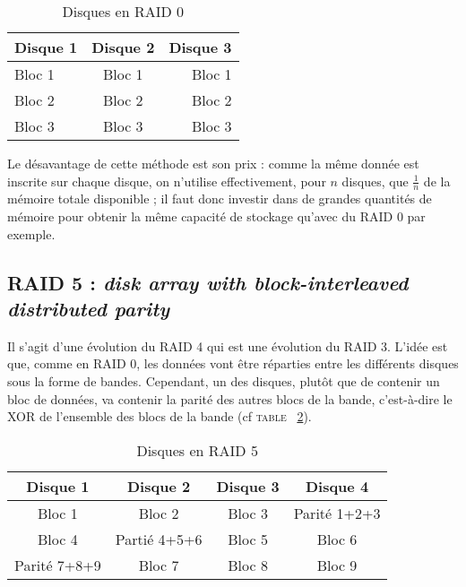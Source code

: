 \begin{table}[h]
    \centering
    \caption{\label{striping} Disques en RAID 0}
    \begin{tabular}{|l|c|r|}
        \hline
        \textbf{Disque 1} & \textbf{Disque 2} & \textbf{Disque 3} \\
        \hline
        Bloc 1 & Bloc 1 & Bloc 1 \\
        \hline
        Bloc 2 & Bloc 2 & Bloc 2 \\
        \hline
        Bloc 3 & Bloc 3 & Bloc 3 \\
        \hline
    \end{tabular}
\end{table}

Le désavantage de cette méthode est son prix : comme la même donnée est inscrite sur chaque disque, on n'utilise effectivement, pour $n$ disques, que $\frac{1}{n}$ de la mémoire totale disponible ; il faut donc investir dans de grandes quantités de mémoire pour obtenir la même capacité de stockage qu'avec du RAID 0 par exemple.

\subsection{RAID 5 : \textit{disk array with block-interleaved distributed parity}}
Il s'agit d'une évolution du RAID 4 qui est une évolution du RAID 3. L'idée est que, comme en RAID 0, les données vont être réparties entre les différents disques sous la forme de bandes. Cependant, un des disques, plutôt que de contenir un bloc de données, va contenir la parité des autres blocs de la bande, c'est-à-dire le XOR de l'ensemble des blocs de la bande (cf \textsc{table ~\ref{raid5}}). 

\begin{table}[h]
    \centering
    \caption{\label{raid5} Disques en RAID 5}
    \begin{tabular}{|c|c|c|c|}
        \hline
        \textbf{Disque 1} & \textbf{Disque 2} & \textbf{Disque 3} & \textbf{Disque 4}\\
        \hline
        Bloc 1 & Bloc 2 & Bloc 3 & Parité 1+2+3 \\
        \hline
        Bloc 4 & Partié 4+5+6 & Bloc 5 & Bloc 6 \\
        \hline
        Parité 7+8+9 & Bloc 7 & Bloc 8 & Bloc 9 \\
        \hline
    \end{tabular}
\end{table}

